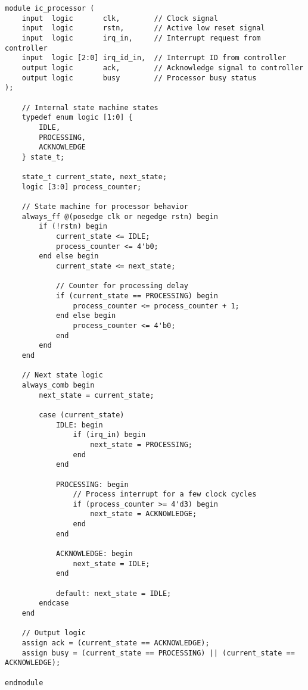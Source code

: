 \documentclass[12pt,a4paper]{article}
\begin{document}
\begin{lstlisting}[caption=Processor Simulation Module, label=lst:processor]
module ic_processor (
    input  logic       clk,        // Clock signal
    input  logic       rstn,       // Active low reset signal
    input  logic       irq_in,     // Interrupt request from controller
    input  logic [2:0] irq_id_in,  // Interrupt ID from controller
    output logic       ack,        // Acknowledge signal to controller
    output logic       busy        // Processor busy status
);

    // Internal state machine states
    typedef enum logic [1:0] {
        IDLE,
        PROCESSING,
        ACKNOWLEDGE
    } state_t;

    state_t current_state, next_state;
    logic [3:0] process_counter;

    // State machine for processor behavior
    always_ff @(posedge clk or negedge rstn) begin
        if (!rstn) begin
            current_state <= IDLE;
            process_counter <= 4'b0;
        end else begin
            current_state <= next_state;
            
            // Counter for processing delay
            if (current_state == PROCESSING) begin
                process_counter <= process_counter + 1;
            end else begin
                process_counter <= 4'b0;
            end
        end
    end

    // Next state logic
    always_comb begin
        next_state = current_state;
        
        case (current_state)
            IDLE: begin
                if (irq_in) begin
                    next_state = PROCESSING;
                end
            end
            
            PROCESSING: begin
                // Process interrupt for a few clock cycles
                if (process_counter >= 4'd3) begin
                    next_state = ACKNOWLEDGE;
                end
            end
            
            ACKNOWLEDGE: begin
                next_state = IDLE;
            end
            
            default: next_state = IDLE;
        endcase
    end

    // Output logic
    assign ack = (current_state == ACKNOWLEDGE);
    assign busy = (current_state == PROCESSING) || (current_state == ACKNOWLEDGE);

endmodule
\end{lstlisting}
\end{document}
